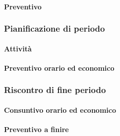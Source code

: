 \planningTable{
	
}

\paragraph{Preventivo}

\smallPreventivoTable{
	
}


\subsubsection{Pianificazione di periodo}



\paragraph{Attività}

\planningTable{
	
}



\paragraph{Preventivo orario ed economico}



\subsubsection{Riscontro di fine periodo}


\paragraph{Consuntivo orario ed economico}


\paragraph{Preventivo a finire}

\pafTable{
	
}
